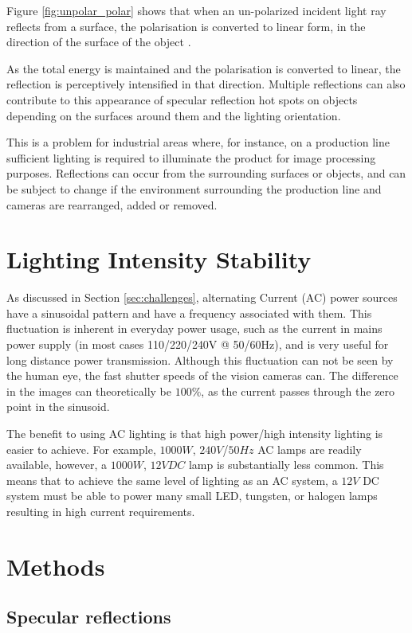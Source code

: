 \documentclass[fleqn,twoside,12pt]{report}
\begin{document}
Figure \ref{fig:unpolar_polar} shows that when an un-polarized incident light ray reflects from a surface, the polarisation is converted to linear form, in the direction of the surface of the object \cite{nelson}.

As the total energy is maintained and the polarisation is converted to linear, the reflection is perceptively intensified in that direction. Multiple reflections can also contribute to this appearance of specular reflection hot spots on objects depending on the surfaces around them and the lighting orientation.

This is a problem for industrial areas where, for instance, on a production line sufficient lighting is required to illuminate the product for image processing purposes. Reflections can occur from the surrounding surfaces or objects, and can be subject to change if the environment surrounding the production line and cameras are rearranged, added or removed.


\section{Lighting Intensity Stability}

As discussed in Section \ref{sec:challenges}, alternating Current (AC) power sources have a sinusoidal pattern and have a frequency associated with them. This fluctuation is inherent in everyday power usage, such as the current in mains power supply (in most cases 110/220/240V @ 50/60Hz), and is very useful for long distance power transmission. Although this fluctuation can not be seen by the human eye, the fast shutter speeds of the vision cameras can. The difference in the images can theoretically be $100\%$, as the current passes through the zero point in the sinusoid.

The benefit to using AC lighting is that high power/high intensity lighting is easier to achieve. For example, $1000W$, $240V$/$50Hz$ AC lamps are readily available, however, a $1000W$, $12VDC$ lamp is substantially less common. This means that to achieve the same level of lighting as an AC system, a $12V$ DC system must be able to power many small LED, tungsten, or halogen lamps resulting in high current requirements.  


\section{Methods}

\subsection{Specular reflections}
\end{document}
